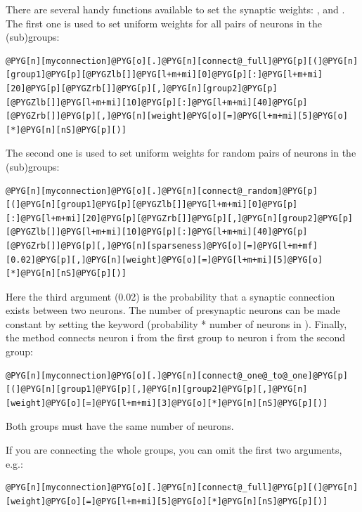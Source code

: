 \documentclass[letterpaper,10pt,english]{manual}
\begin{document}
There are several handy functions available to set the synaptic weights:
,  and
. The first one
is used to set uniform weights for all pairs of neurons in the (sub)groups:

\begin{Verbatim}[commandchars=@\[\]]
@PYG[n][myconnection]@PYG[o][.]@PYG[n][connect@_full]@PYG[p][(]@PYG[n][group1]@PYG[p][@PYGZlb[]]@PYG[l+m+mi][0]@PYG[p][:]@PYG[l+m+mi][20]@PYG[p][@PYGZrb[]]@PYG[p][,]@PYG[n][group2]@PYG[p][@PYGZlb[]]@PYG[l+m+mi][10]@PYG[p][:]@PYG[l+m+mi][40]@PYG[p][@PYGZrb[]]@PYG[p][,]@PYG[n][weight]@PYG[o][=]@PYG[l+m+mi][5]@PYG[o][*]@PYG[n][nS]@PYG[p][)]
\end{Verbatim}

The second one is used to set uniform weights for random pairs of neurons in the (sub)groups:

\begin{Verbatim}[commandchars=@\[\]]
@PYG[n][myconnection]@PYG[o][.]@PYG[n][connect@_random]@PYG[p][(]@PYG[n][group1]@PYG[p][@PYGZlb[]]@PYG[l+m+mi][0]@PYG[p][:]@PYG[l+m+mi][20]@PYG[p][@PYGZrb[]]@PYG[p][,]@PYG[n][group2]@PYG[p][@PYGZlb[]]@PYG[l+m+mi][10]@PYG[p][:]@PYG[l+m+mi][40]@PYG[p][@PYGZrb[]]@PYG[p][,]@PYG[n][sparseness]@PYG[o][=]@PYG[l+m+mf][0.02]@PYG[p][,]@PYG[n][weight]@PYG[o][=]@PYG[l+m+mi][5]@PYG[o][*]@PYG[n][nS]@PYG[p][)]
\end{Verbatim}

Here the third argument (0.02) is the probability that a synaptic connection exists between two neurons.
The number of presynaptic neurons can be made constant by setting the keyword 
(probability * number of neurons in ).
Finally, the method  connects neuron i from the first
group to neuron i from the second group:

\begin{Verbatim}[commandchars=@\[\]]
@PYG[n][myconnection]@PYG[o][.]@PYG[n][connect@_one@_to@_one]@PYG[p][(]@PYG[n][group1]@PYG[p][,]@PYG[n][group2]@PYG[p][,]@PYG[n][weight]@PYG[o][=]@PYG[l+m+mi][3]@PYG[o][*]@PYG[n][nS]@PYG[p][)]
\end{Verbatim}

Both groups must have the same number of neurons.

If you are connecting the whole groups, you can omit the first two arguments, e.g.:

\begin{Verbatim}[commandchars=@\[\]]
@PYG[n][myconnection]@PYG[o][.]@PYG[n][connect@_full]@PYG[p][(]@PYG[n][weight]@PYG[o][=]@PYG[l+m+mi][5]@PYG[o][*]@PYG[n][nS]@PYG[p][)]
\end{Verbatim}
\end{document}
